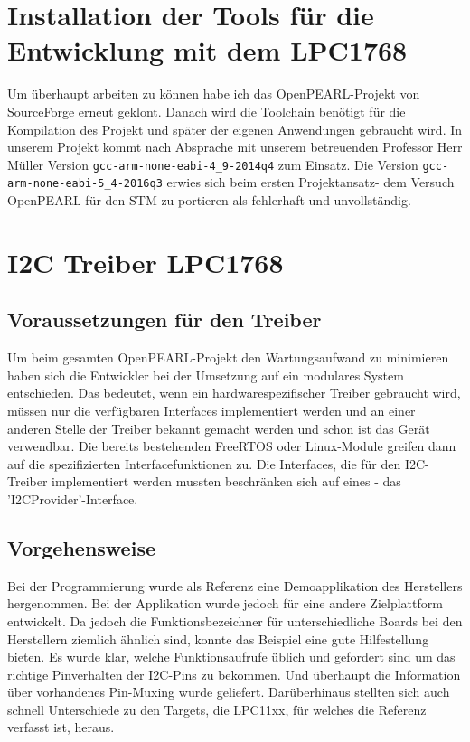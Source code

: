 \documentclass[12pt,a4paper]{article}
\author{Jonathan Weißenberger}
\begin{document}
\section{Installation der Tools für die Entwicklung mit dem LPC1768}
Um überhaupt arbeiten zu können habe ich das OpenPEARL-Projekt von SourceForge erneut geklont. Danach wird die Toolchain benötigt für die Kompilation des Projekt und später der eigenen Anwendungen gebraucht wird. In unserem Projekt kommt nach Absprache mit unserem betreuenden Professor Herr Müller Version \verb+gcc-arm-none-eabi-4_9-2014q4+
 zum Einsatz. 
Die Version \verb+gcc-arm-none-eabi-5_4-2016q3+
 erwies sich beim ersten Projektansatz- dem Versuch OpenPEARL für den STM zu portieren als fehlerhaft und unvollständig.
\section{I2C Treiber LPC1768}
\subsection{Voraussetzungen für den Treiber}
Um beim gesamten OpenPEARL-Projekt den Wartungsaufwand zu minimieren haben sich die Entwickler bei der Umsetzung auf ein modulares System entschieden. Das bedeutet, wenn ein hardwarespezifischer Treiber gebraucht wird, müssen nur die verfügbaren Interfaces implementiert werden und an einer anderen Stelle der Treiber bekannt gemacht werden und schon ist das Gerät verwendbar. Die bereits bestehenden FreeRTOS oder Linux-Module greifen dann auf die spezifizierten Interfacefunktionen zu. 
Die Interfaces, die für den I2C-Treiber implementiert werden mussten beschränken sich auf eines - das 'I2CProvider'-Interface.
\subsection{Vorgehensweise}
Bei der Programmierung wurde als Referenz eine Demoapplikation des Herstellers hergenommen. Bei der Applikation wurde jedoch für eine andere Zielplattform entwickelt. Da jedoch die Funktionsbezeichner für unterschiedliche Boards bei den Herstellern ziemlich ähnlich sind, konnte das Beispiel eine gute Hilfestellung bieten. Es wurde klar, welche Funktionsaufrufe üblich und gefordert sind um das richtige Pinverhalten der I2C-Pins zu bekommen. Und überhaupt die Information über vorhandenes Pin-Muxing wurde geliefert. Darüberhinaus stellten sich auch schnell Unterschiede zu den Targets, die LPC11xx, für welches die Referenz verfasst ist, heraus.
\end{document}
